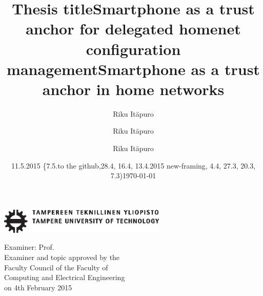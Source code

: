 \documentclass[12pt,a4paper,english]{tutthesis}
\author{Riku Itäpuro}
\title{Thesis title}      %
\author{Riku Itäpuro}
\title{Smartphone as a trust anchor for delegated homenet configuration management}
\author{Riku Itäpuro}
\date{11.5.2015  \{7.5.to the github,28.4, 16.4, 13.4.2015 new-framing, 4.4, 27.3,  20.3, 7.3)}
\title{Smartphone as a trust anchor in home networks}
\begin{document}
\maketitle



\newpage             %

 \pagestyle{headings}
 \thispagestyle{empty}
\date\today
 \vspace*{-.5cm}\noindent
 \includegraphics[width=8cm]{tty_tut_logo}   %

\vspace{6.8cm}
\maketitle
\vspace{6.7cm} %

\begin{flushright}  
  \begin{minipage}[c]{6.8cm}
    \begin{spacing}{1.0}
      \textsf{Examiner: Prof. \@examiner}\\
      \textsf{Examiner and topic approved by the}\\ 
      \textsf{Faculty Council of the Faculty of} \\
      \textsf{Computing and Electrical Engineering} \\
      \textsf{on 4th February 2015}\\
    \end{spacing}
  \end{minipage}
\end{flushright}
\end{document}
